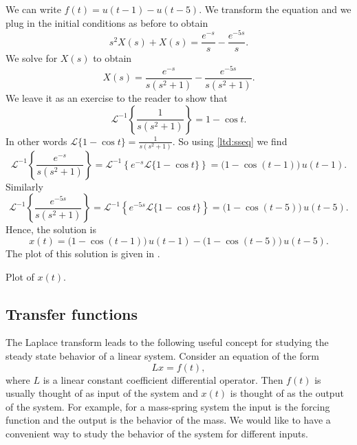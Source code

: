 \begin{exampleSol}
We can
write $f(t) = u(t-1) - u(t-5)$.  We transform the equation and we plug in
the initial conditions as before to obtain
\begin{equation*}
s^2 X(s) + X(s) = \frac{e^{-s}}{s} - \frac{e^{-5s}}{s} .
\end{equation*}
We solve for $X(s)$ to obtain
\begin{equation*}
X(s) = \frac{e^{-s}}{s(s^2+1)} - \frac{e^{-5s}}{s(s^2+1)} .
\end{equation*}
We leave it as an exercise to the reader to show that
\begin{equation*}
{\mathcal{L}}^{-1} \left\{ \frac{1}{s(s^2+1)} \right\}
= 1 - \cos t .
\end{equation*}
In other words 
$\mathcal{L} \{ 1 - \cos t  \} = 
\frac{1}{s(s^2+1)}$.  So using \eqref{ltd:sseq} we find
\begin{equation*}
{\mathcal{L}}^{-1} \left\{ \frac{e^{-s}}{s(s^2+1)} \right\}
=
{\mathcal{L}}^{-1} \left\{
e^{-s}
\mathcal{L} \{ 1 - \cos t \}
\right\}
=
\bigl( 1 - \cos (t-1) \bigr) \, u(t-1) .
\end{equation*}
Similarly
\begin{equation*}
{\mathcal{L}}^{-1} \left\{ \frac{e^{-5s}}{s(s^2+1)} \right\}
=
{\mathcal{L}}^{-1} \left\{
e^{-5s}
\mathcal{L} \{ 1 - \cos t \}
\right\}
=
\bigl( 1 - \cos (t-5) \bigr) \, u(t-5) .
\end{equation*}
Hence, the solution is
\begin{equation*}
x(t) = 
\bigl( 1 - \cos (t-1) \bigr) \, u(t-1) -
\bigl( 1 - \cos (t-5) \bigr) \, u(t-5) .
\end{equation*}
The plot of this solution is given in .

\begin{myfig}
\capstart
{}
\caption{Plot of $x(t)$.\label{lt:heavisideexfig}}
\end{myfig}
\end{exampleSol}

\subsection{Transfer functions}

The Laplace transform leads to the following useful concept for studying the
steady state behavior of a linear system.  Consider an equation of the
form
\begin{equation*}
L x = f(t) ,
\end{equation*}
where $L$ is a linear constant coefficient differential operator.
Then $f(t)$ is usually thought of as input of the system and $x(t)$ is
thought of as the output of the system.  For example, for a mass-spring
system the input is the forcing function and the output is the behavior of the
mass.  We would like to have a convenient way to study the behavior of
the system for different inputs.

